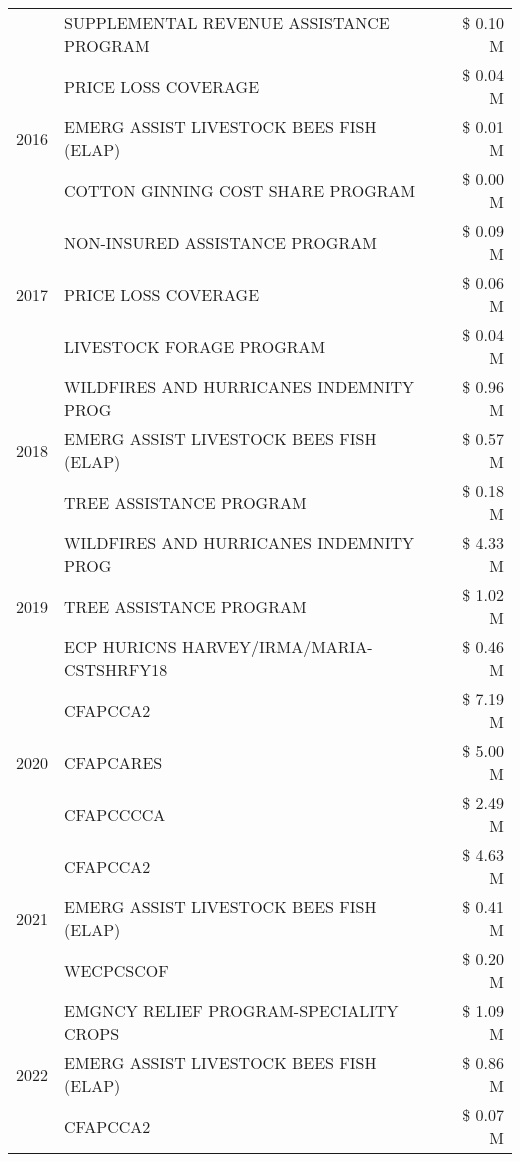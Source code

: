 \begin{tabular}{llr}
 & SUPPLEMENTAL REVENUE ASSISTANCE PROGRAM & \$ 0.10 M \\
\cline{1-3}
\multirow[t]{3}{*}{2016} & PRICE LOSS COVERAGE & \$ 0.04 M \\
 & EMERG ASSIST LIVESTOCK BEES FISH (ELAP) & \$ 0.01 M \\
 & COTTON GINNING COST SHARE PROGRAM & \$ 0.00 M \\
\cline{1-3}
\multirow[t]{3}{*}{2017} & NON-INSURED ASSISTANCE PROGRAM & \$ 0.09 M \\
 & PRICE LOSS COVERAGE & \$ 0.06 M \\
 & LIVESTOCK FORAGE PROGRAM & \$ 0.04 M \\
\cline{1-3}
\multirow[t]{3}{*}{2018} & WILDFIRES AND HURRICANES INDEMNITY PROG & \$ 0.96 M \\
 & EMERG ASSIST LIVESTOCK BEES FISH (ELAP) & \$ 0.57 M \\
 & TREE ASSISTANCE PROGRAM & \$ 0.18 M \\
\cline{1-3}
\multirow[t]{3}{*}{2019} & WILDFIRES AND HURRICANES INDEMNITY PROG & \$ 4.33 M \\
 & TREE ASSISTANCE PROGRAM & \$ 1.02 M \\
 & ECP HURICNS HARVEY/IRMA/MARIA-CSTSHRFY18 & \$ 0.46 M \\
\cline{1-3}
\multirow[t]{3}{*}{2020} & CFAPCCA2 & \$ 7.19 M \\
 & CFAPCARES & \$ 5.00 M \\
 & CFAPCCCCA & \$ 2.49 M \\
\cline{1-3}
\multirow[t]{3}{*}{2021} & CFAPCCA2 & \$ 4.63 M \\
 & EMERG ASSIST LIVESTOCK BEES FISH (ELAP) & \$ 0.41 M \\
 & WECPCSCOF & \$ 0.20 M \\
\cline{1-3}
\multirow[t]{3}{*}{2022} & EMGNCY RELIEF PROGRAM-SPECIALITY CROPS & \$ 1.09 M \\
 & EMERG ASSIST LIVESTOCK BEES FISH (ELAP) & \$ 0.86 M \\
 & CFAPCCA2 & \$ 0.07 M \\
\cline{1-3}
\bottomrule
\end{tabular}
